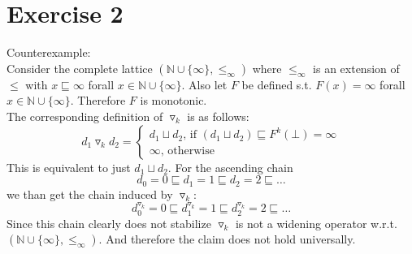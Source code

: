 \documentclass[fleqn,12pt]{article}
\begin{document}
\section*{Exercise 2}
Counterexample:\\
Consider the complete lattice $(\mathbb{N}\cup\lbrace \infty \rbrace, \leq_{\infty})$ where $\leq_{\infty}$ is an extension of $\leq$ with $x \sqsubseteq \infty$ forall $x \in \mathbb{N}\cup\lbrace \infty \rbrace$.
Also let $F$ be defined s.t. $F(x)=\infty$ forall $x \in \mathbb{N}\cup\lbrace \infty \rbrace$.
Therefore $F$ is monotonic.\\
The corresponding definition of $\triangledown_k$ is as follows:\\
$$d_1 \triangledown_k d_2 =
	\begin{cases}
	d_1 \sqcup d_2 \text{, if } (d_1 \sqcup d_2) \sqsubseteq F^k(\bot)=\infty\\
	\infty \text{, otherwise}
	\end{cases}$$
This is equivalent to just $ d_1 \sqcup d_2$.
For the ascending chain
$$d_0=0 \sqsubseteq d_1=1\sqsubseteq d_2=2 \sqsubseteq \dots$$ we than get the chain induced by $\triangledown_k$:
$$d_0^{\triangledown_k}=0 \sqsubseteq d_1^{\triangledown_k}=1\sqsubseteq d_2^{\triangledown_k}=2 \sqsubseteq \dots$$
Since this chain clearly does not stabilize $\triangledown_k$ is not a widening operator w.r.t. $(\mathbb{N}\cup\lbrace \infty \rbrace, \leq_{\infty})$.
And therefore the claim does not hold universally.
%
\end{document}

